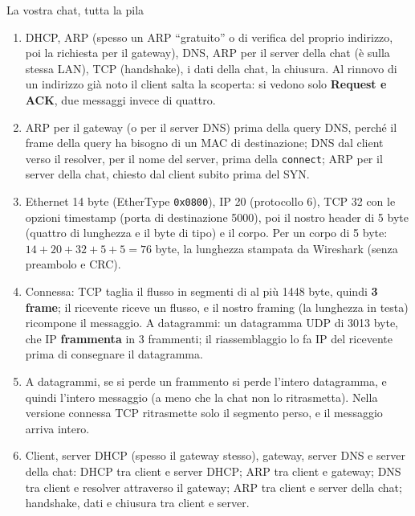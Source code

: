 \begin{esercizio}{La vostra chat, tutta la pila}
\svolgimento
\begin{enumerate}[label=(\alph*)]
    \item DHCP, ARP (spesso un ARP ``gratuito'' o di verifica del proprio indirizzo, poi la richiesta per il gateway), DNS, ARP per il
          server della chat (è sulla stessa LAN), TCP (handshake), i dati della chat, la chiusura. Al rinnovo di un indirizzo già noto il
          client salta la scoperta: si vedono solo \textbf{Request e ACK}, due messaggi invece di quattro.
    \item ARP per il gateway (o per il server DNS) prima della query DNS, perché il frame della query ha bisogno di un MAC di destinazione;
          DNS dal client verso il resolver, per il nome del server, prima della \texttt{connect}; ARP per il server della chat, chiesto dal
          client subito prima del SYN.
    \item Ethernet 14 byte (EtherType \texttt{0x0800}), IP 20 (protocollo 6), TCP 32 con le opzioni timestamp (porta di destinazione 5000),
          poi il nostro header di 5 byte (quattro di lunghezza e il byte di tipo) e il corpo. Per un corpo di 5 byte: $14 + 20 + 32 + 5 + 5 =
          76$ byte, la lunghezza stampata da Wireshark (senza preambolo e CRC).
    \item Connessa: TCP taglia il flusso in segmenti di al più 1448 byte, quindi \textbf{3 frame}; il ricevente riceve un flusso, e il nostro
          framing (la lunghezza in testa) ricompone il messaggio. A datagrammi: un datagramma UDP di 3013 byte, che IP \textbf{frammenta} in 3
          frammenti; il riassemblaggio lo fa IP del ricevente prima di consegnare il datagramma.
    \item A datagrammi, se si perde un frammento si perde l'intero datagramma, e quindi l'intero messaggio (a meno che la chat non lo
          ritrasmetta). Nella versione connessa TCP ritrasmette solo il segmento perso, e il messaggio arriva intero.
    \item Client, server DHCP (spesso il gateway stesso), gateway, server DNS e server della chat: DHCP tra client e server DHCP; ARP tra
          client e gateway; DNS tra client e resolver attraverso il gateway; ARP tra client e server della chat; handshake, dati e chiusura
          tra client e server.
\end{enumerate}
\end{esercizio}

